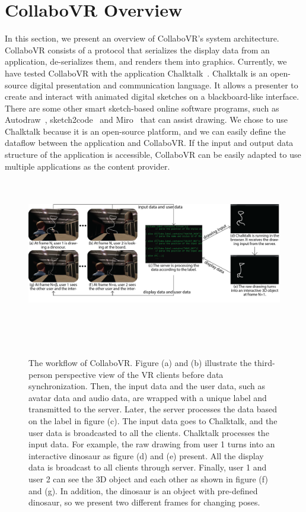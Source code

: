 \documentclass{sigchi}
\begin{document}
\section{CollaboVR Overview}
In this section, we present an overview of CollaboVR's system architecture. CollaboVR consists of a protocol that serializes the display data from an application, de-serializes them, and renders them into graphics. Currently, we have tested CollaboVR with the application Chalktalk~\cite{perlin2018chalktalk}. Chalktalk is an open-source digital presentation and communication language. It allows a presenter to create and interact with animated digital sketches on a blackboard-like interface. There are some other smart sketch-based online software programs, such as Autodraw~\cite{Autodraw}, sketch2code~\cite{Sketch2code} and Miro~\cite{Miro} that can assist drawing. We chose to use Chalktalk because it is an open-source platform, and we can easily define the dataflow between the application and CollaboVR. If the input and output data structure of the application is accessible, CollaboVR can be easily adapted to use multiple applications as the content provider.

\begin{figure}[ht!]
 \centering
 \includegraphics[height = 6.5cm]{Figure2.png}
 \caption{The workflow of CollaboVR. Figure (a) and (b) illustrate the third-person perspective view of the VR clients before data synchronization. Then, the input data and the user data, such as avatar data and audio data, are wrapped with a unique label and transmitted to the server. Later, the server processes the data based on the label in figure (c). The input data goes to Chalktalk, and the user data is broadcasted to all the clients. Chalktalk processes the input data. For example, the raw drawing from user 1 turns into an interactive dinosaur as figure (d) and (e) present. All the display data is broadcast to all clients through server. Finally, user 1 and user 2 can see the 3D object and each other as shown in figure (f) and (g). In addition, the dinosaur is an object with pre-defined dinosaur, so we present two different frames for changing poses.}
 ~\label{fig:workflow}
\end{figure}
\end{document}
